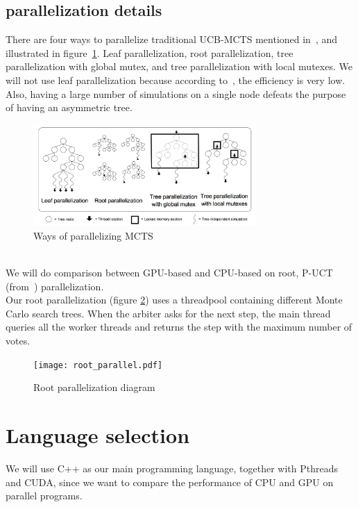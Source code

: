 \documentclass[sigconf]{acmart}
\begin{document}
\subsection{parallelization details}
There are four ways to parallelize traditional UCB-MCTS mentioned in~\cite{guillaumeMCTS}, and illustrated in figure~\ref{fig:mcts_parallel}. Leaf parallelization, root parallelization, tree parallelization with global mutex, and tree parallelization with local mutexes. We will not use leaf parallelization because according to~\cite{guillaumeMCTS}, the efficiency is very low. Also, having a large number of simulations on a single node defeats the purpose of having an asymmetric tree.
\begin{figure}[h]
  \includegraphics[width=8.5cm]{MCTS-parallel.png}
  \caption{Ways of parallelizing MCTS}
\label{fig:mcts_parallel}
\end{figure}\\
We will do comparison between GPU-based and CPU-based on root, P-UCT (from~\cite{Liu2020Watch}) parallelization. \\
Our root parallelization (figure \ref{fig:root_parallel}) uses a threadpool containing different Monte Carlo search trees. When the arbiter asks for the next step, the main thread queries all the worker threads and returns the step with the maximum number of votes. 
\begin{figure}[h]
  \texttt{[image: root\_parallel.pdf]}
  \caption{Root parallelization diagram}
\label{fig:root_parallel}
\end{figure}


\section{Language selection}
We will use C++ as our main programming language, together with Pthreads and CUDA, since we want to compare the performance of CPU and GPU on parallel programs. 
\end{document}
